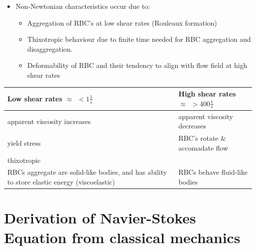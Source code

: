 \documentclass{beamer}
\begin{document}
	
			    \begin{frame}
			    \begin{itemize}
			      	\item Non-Newtonian characteristics occur due to: \begin{itemize}
    	    \item Aggregation of RBC's at low shear rates (Rouleaux formation)
    	    \item Thixotropic behaviour due to finite time needed for RBC aggregation and disaggregation.
    	    \item Deformability of RBC and their tendency to align with flow field at high shear rates
    	\end{itemize}
    	\end{itemize}
			            \begin{table}[h]
    		\centering
    		\begin{tabular}{p{5cm}p{5cm}}
    			Low shear rates $\approx \hspace{5pt}< 1 \frac{1}{s}$ & High shear rates $\approx\hspace{5pt} > 400 \frac{1}{s}$ \\
    			\hline
    			apparent viscosity increases & apparent viscosity decreases \\
    		 yield stress & RBC's rotate \& accomadate flow\\
    		thixotropic  & \\
    	 RBCs aggregate are solid-like bodies, and  has ability to store elastic energy (viscoelastic) & RBCs behave fluid-like  bodies\\ 
    		\end{tabular}
    	\end{table}
		    \end{frame}
	\section[Classical Mechanics]{Derivation of Navier-Stokes Equation from classical mechanics}
\end{document}
